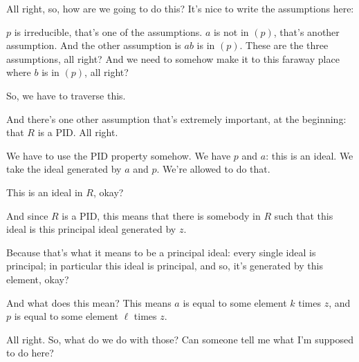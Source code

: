 \begin{proofWrapper}
\begin{speech}[00:48:42 - 00:50:42]
All right, so, how are we going to do this? It's nice to write the assumptions here: 

$p$ is irreducible, that's one of the assumptions. $a$ is not in $(p)$, that's another assumption. And the other assumption is $ab$ is in $(p)$. These are the three assumptions, all right? And we need to somehow make it to this faraway place where $b$ is in $(p)$, all right? 

So, we have to traverse this.

And there's one other assumption that's extremely important, at the beginning: that $R$ is a PID.  All right.

We have to use the PID property somehow. We have $p$ and $a$: this is an ideal. We take the ideal generated by $a$ and $p$.  We're allowed to do that.

This is an ideal in $R$, okay? 

And since $R$ is a PID,  this means that there is somebody in $R$  such that this ideal is this principal ideal generated by $z$. 

Because that's what it means to be a principal ideal: every single ideal is principal; in particular this ideal is principal, and so, it's generated by this element, okay?

And what does this mean? This means $a$ is equal to some element $k$ times $z$, and $p$ is equal to some element $\ell$ times $z$. 
\end{speech}

\begin{hidden}
\end{hidden}

\begin{speech}[00:50:42 - 00:50:50]
All right. So, what do we do with those? Can someone tell me what I'm supposed to do here?


\end{speech}
\end{proofWrapper}
